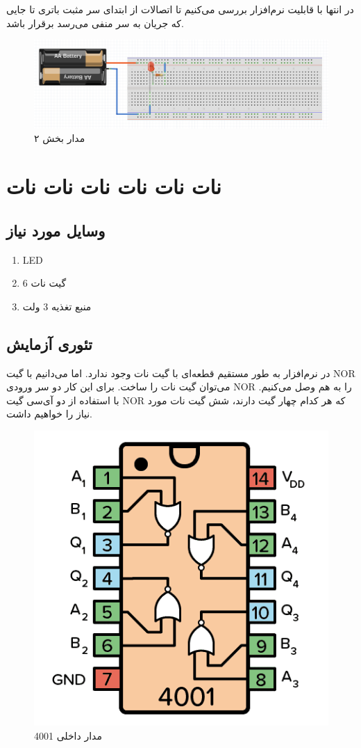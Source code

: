 در انتها با قابلیت نرم‌افزار بررسی می‌کنیم تا اتصالات از ابتدای سر مثبت باتری تا جایی که
جریان به سر منفی می‌رسد برقرار باشد.

\begin{figure}[h]
\centering
\includegraphics[scale=0.3]{introduction/5.png}    
\caption{مدار بخش ۲}
\end{figure}

\newpage
\section{نات نات نات نات نات نات}
\subsection*{وسایل مورد نیاز}
\begin{enumerate}
    \item LED
    \item 6 گیت نات
    \item منبع تغذیه 3 ولت
\end{enumerate}

\subsection*{تئوری آزمایش}
در نرم‌افزار به طور مستقیم قطعه‌ای با گیت نات وجود ندارد.
اما می‌دانیم با گیت
NOR
می‌توان گیت نات را ساخت.
برای این کار دو سر ورودی
NOR
را به هم وصل می‌کنیم.
با استفاده از دو آی‌سی
گیت
NOR
که هر کدام چهار گیت دارند، شش گیت نات مورد نیاز را خواهیم داشت.

\begin{figure}[h]
\centering
\includegraphics[scale=0.3]{introduction/not.png}    
\caption{مدار داخلی 4001}
\end{figure}

